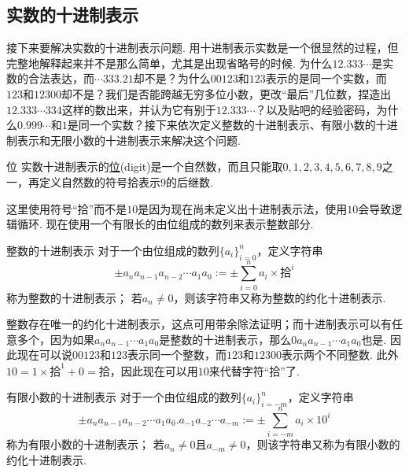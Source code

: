 \subsection{实数的十进制表示}

接下来要解决实数的十进制表示问题. 用十进制表示实数是一个很显然的过程，但完整地解释起来并不是那么简单，尤其是出现省略号的时候. 为什么\(12.333\cdots\)是实数的合法表达，而\(\cdots333.21\)却不是？为什么\(00123\)和\(123\)表示的是同一个实数，而\(123\)和\(12300\)却不是？我们是否能跨越无穷多位小数，更改“最后”几位数，捏造出\(12.333\cdots334\)这样的数出来，并认为它有别于\(12.333\cdots\)？以及贴吧的经验密码，为什么\(0.999\cdots\)和\(1\)是同一个实数？接下来依次定义整数的十进制表示、有限小数的十进制表示和无限小数的十进制表示来解决这个问题.

\begin{definition}{位}
    实数十进制表示的\underline{位}(digit)是一个自然数，而且只能取\(0,1,2,3,4,5,6,7,8,9\)之一，再定义自然数的符号\(\mbox{拾}\)表示\(9\)的后继数.
\end{definition}

这里使用符号“拾”而不是\(10\)是因为现在尚未定义出十进制表示法，使用\(10\)会导致逻辑循环. 现在使用一个有限长的由位组成的数列来表示整数部分.

\begin{definition}{整数的十进制表示}
    对于一个由位组成的数列\(\{a_i\}_{i=0}^n\)，定义字符串
    \[\pm a_n a_{n-1} a_{n-2} \cdots a_1 a_0 := \pm \sum_{i=0}^{n} a_i \times \mbox{拾}^i\]
    称为整数的十进制表示；
    \newline
    若\(a_n \neq 0\)，则该字符串又称为整数的约化十进制表示.
\end{definition}

整数存在唯一的约化十进制表示，这点可用带余除法证明；而十进制表示可以有任意多个，因为如果\(a_n a_{n-1}\cdots a_1 a_0\)是整数的十进制表示，那么\(0a_n a_{n-1}\cdots a_1 a_0\)也是. 因此现在可以说\(00123\)和\(123\)表示同一个整数，而\(123\)和\(12300\)表示两个不同整数. 此外\(10=1 \times \mbox{拾}^1+0=\mbox{拾}\)，因此现在可以用\(10\)来代替字符“拾”了.

\begin{definition}{有限小数的十进制表示}
    对于一个由位组成的数列\(\{a_i\}_{i=-m}^n\)，定义字符串
    \[\pm a_n a_{n-1} a_{n-2} \cdots a_1 a_0.a_{-1} a_{-2} \cdots a_{-m}:= \pm \sum_{i=-m}^{n} a_i \times 10^i\]
    称为有限小数的十进制表示；
    \newline
    若\(a_n \neq 0\)且\(a_{-m} \neq 0\)，则该字符串又称为有限小数的约化十进制表示.
\end{definition}

